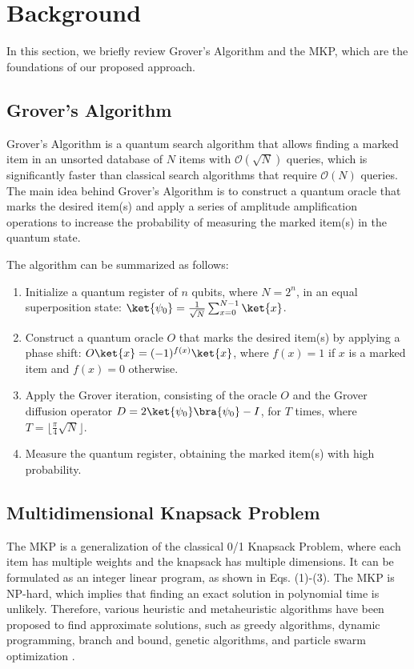 \section{Background} \label{sec:background}
In this section, we briefly review Grover's Algorithm and the MKP, which are the foundations of our proposed approach.

\subsection{Grover's Algorithm}
Grover's Algorithm is a quantum search algorithm that allows finding a marked item in an unsorted database of $N$ items with $\mathcal{O}(\sqrt{N})$ queries, which is significantly faster than classical search algorithms that require $\mathcal{O}(N)$ queries. The main idea behind Grover's Algorithm is to construct a quantum oracle that marks the desired item(s) and apply a series of amplitude amplification operations to increase the probability of measuring the marked item(s) in the quantum state.

The algorithm can be summarized as follows:

\begin{enumerate}
    \item Initialize a quantum register of $n$ qubits, where $N = 2^n$, in an equal superposition state: $\ket{\psi_0} = \frac{1}{\sqrt{N}} \sum_{x=0}^{N-1} \ket{x}$.
    
    \item Construct a quantum oracle $O$ that marks the desired item(s) by applying a phase shift: $O\ket{x} = (-1)^{f(x)}\ket{x}$, where $f(x) = 1$ if $x$ is a marked item and $f(x) = 0$ otherwise.
    
    \item Apply the Grover iteration, consisting of the oracle $O$ and the Grover diffusion operator $D = 2\ket{\psi_0}\bra{\psi_0} - I$, for $T$ times, where $T = \lfloor\frac{\pi}{4}\sqrt{N}\rfloor$.
    
    \item Measure the quantum register, obtaining the marked item(s) with high probability.
\end{enumerate}

\subsection{Multidimensional Knapsack Problem}
The MKP is a generalization of the classical 0/1 Knapsack Problem, where each item has multiple weights and the knapsack has multiple dimensions. It can be formulated as an integer linear program, as shown in Eqs. (1)-(3). The MKP is NP-hard, which implies that finding an exact solution in polynomial time is unlikely. Therefore, various heuristic and metaheuristic algorithms have been proposed to find approximate solutions, such as greedy algorithms, dynamic programming, branch and bound, genetic algorithms, and particle swarm optimization \cite{mkp_survey}.

